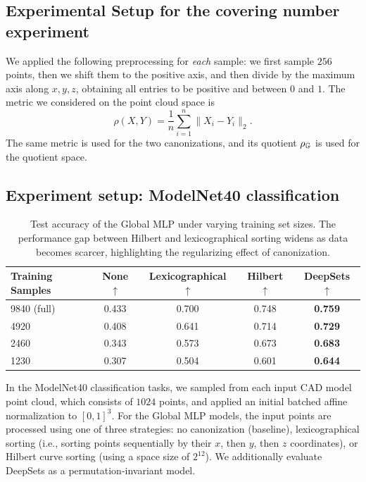 \subsection{Experimental Setup for the covering number experiment}
We applied the following preprocessing for \emph{each} sample: we first sample $256$ points, then we shift them to the positive axis, and then divide by the maximum axis along $x,y,z$, obtaining all entries to be positive and between $0$ and $1$. The metric we considered on the point cloud space is
$$\rho(X,Y) = \frac{1}{n}\sum^{n}_{i=1}\|X_i-Y_i\|_2 .$$
The same metric is used for the two canonizations, and its quotient $\rho_{\mathbb{G}}$ is used for the quotient space.

\subsection{Experiment setup: ModelNet40 classification}
\begin{table}[ht]
\centering
\caption{Test accuracy of the Global MLP under varying training set sizes. The performance gap between Hilbert and lexicographical sorting widens as data becomes scarcer, highlighting the regularizing effect of canonization.}
\label{tab:data_scarcity}
\begin{tabular}{lcccc}
\toprule
\textbf{Training Samples} & \textbf{None} $\uparrow$ & \textbf{Lexicographical} $\uparrow$ & \textbf{Hilbert} $\uparrow$ & \textbf{DeepSets} $\uparrow$ \\
\midrule
9840 (full) & 0.433 & 0.700 & 0.748 & \textbf{0.759} \\
4920 & 0.408 & 0.641 & 0.714 & \textbf{0.729}  \\
2460 & 0.343 & 0.573 & 0.673 & \textbf{0.683}  \\
1230 & 0.307 & 0.504 & 0.601 & \textbf{0.644}  \\
\bottomrule
\end{tabular}
\end{table}
In the ModelNet40 classification tasks, we sampled from each input CAD model point cloud, which consists of $1024$ points, and applied an initial batched affine normalization to $[0,1]^3$. For the Global MLP models, the input points are processed using one of three strategies: no canonization (baseline), lexicographical sorting (i.e., sorting points sequentially by their $x$, then $y$, then $z$ coordinates), or Hilbert curve sorting (using a space size of $2^{12}$). We additionally evaluate DeepSets as a permutation-invariant model.

